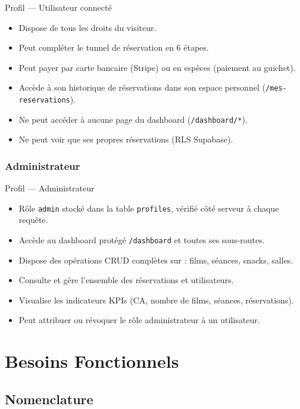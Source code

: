 \documentclass[12pt,a4paper,openany]{report}
\begin{document}
\begin{reqbox}{Profil — Utilisateur connecté}
\begin{itemize}[noitemsep]
  \item Dispose de tous les droits du visiteur.
  \item Peut compléter le tunnel de réservation en 6 étapes.
  \item Peut payer par carte bancaire (Stripe) ou en espèces (paiement au guichet).
  \item Accède à son historique de réservations dans son espace personnel (\texttt{/mes-reservations}).
  \item Ne peut accéder à aucune page du dashboard (\texttt{/dashboard/*}).
  \item Ne peut voir que ses propres réservations (RLS Supabase).
\end{itemize}
\end{reqbox}

\subsection{Administrateur}

\begin{reqbox}{Profil — Administrateur}
\begin{itemize}[noitemsep]
  \item Rôle \texttt{admin} stocké dans la table \texttt{profiles}, vérifié côté serveur à chaque requête.
  \item Accède au dashboard protégé \texttt{/dashboard} et toutes ses sous-routes.
  \item Dispose des opérations CRUD complètes sur : films, séances, snacks, salles.
  \item Consulte et gère l'ensemble des réservations et utilisateurs.
  \item Visualise les indicateurs KPIs (CA, nombre de films, séances, réservations).
  \item Peut attribuer ou révoquer le rôle administrateur à un utilisateur.
\end{itemize}
\end{reqbox}

\chapter{Besoins Fonctionnels}

\section{Nomenclature}
\end{document}
